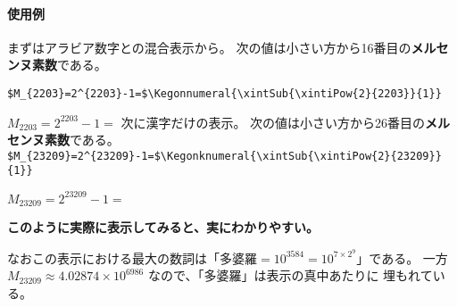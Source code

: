 \documentclass[dvipdfmx]{jsarticle}
\newif\ifSkipXint
\begin{document}
\paragraph{使用例}
まずはアラビア数字との混合表示から。
% 
% 
次の値は小さい方から16番目の\textbf{メルセンヌ素数}である。

\noindent\verb+$M_{2203}=2^{2203}-1=$\Kegonnumeral{\xintSub{\xintiPow{2}{2203}}{1}}+
\par\noindent$M_{2203}=2^{2203}-1=$
\vfil
\noindent 次に漢字だけの表示。
次の値は小さい方から26番目の\textbf{メルセンヌ素数}である。
\newpage
\noindent\verb+$M_{23209}=2^{23209}-1=$\Kegonknumeral{\xintSub{\xintiPow{2}{23209}}{1}}+
\par\noindent$M_{23209}=2^{23209}-1=$
\ifSkipXint
  \newread\MersenneFile \openin\MersenneFile=M23209.dat \read\MersenneFile to\TwentySixthMersennePrime \closein\MersenneFile
  \Kegonknumeral\TwentySixthMersennePrime
\else
\fi
\begin{center}\bfseries\large
このように実際に表示してみると、実にわかりやすい。
\end{center}
なおこの表示における最大の数詞は「$\text{多婆羅}=10^{3584}=10^{7\times2^9}$」である。
一方 $M_{23209}\approx 4.02874\times10^{6986}$ なので、「多婆羅」は表示の真中あたりに
埋もれている。
\end{document}

